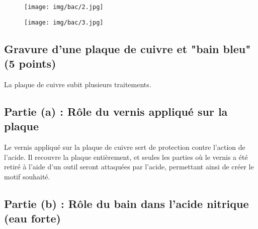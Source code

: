 \documentclass[answers]{exam}
\begin{document}
\begin{figure}[H]
  \centering
  \texttt{[image: img/bac/2.jpg]}
\end{figure}

\begin{figure}[H]
  \centering
  \texttt{[image: img/bac/3.jpg]}
\end{figure}

\subsection*{Gravure d'une plaque de cuivre et "bain bleu" (5 points)}

\begin{questions}

\question[1] La plaque de cuivre subit plusieurs traitements.



\begin{solution}
\subsection*{Partie (a) : Rôle du vernis appliqué sur la plaque}

Le vernis appliqué sur la plaque de cuivre sert de protection contre l'action de l'acide. Il recouvre la plaque entièrement, et seules les parties où le vernis a été retiré à l'aide d'un outil seront attaquées par l'acide, permettant ainsi de créer le motif souhaité.

\subsection*{Partie (b) : Rôle du bain dans l'acide nitrique (eau forte)}


\end{solution}
\end{questions}
\end{document}
